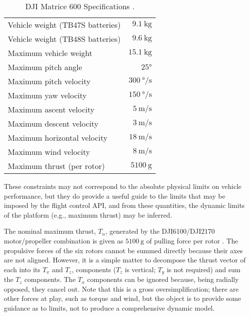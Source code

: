\documentclass[doc]{apa6}
\begin{document}
\begin{table}
\begin{center}
\begin{tabular}{ l r }
\hline
Vehicle weight (TB47S batteries) & $\SI{9.1}\kg$ \\ 
Vehicle weight (TB48S batteries) & $\SI{9.6}\kg$ \\
Maximum vehicle weight & $\SI{15.1}\kg$ \\
Maximum pitch angle & $\ang{25}$ \\
Maximum pitch velocity & $\SI{300}{\degree\per\second}$ \\
Maximum yaw velocity & $\SI{150}{\degree\per\second}$ \\
Maximum ascent velocity & $\SI{5}{\metre\per\second}$ \\
Maximum descent velocity & $\SI{3}{\metre\per\second}$ \\
Maximum horizontal velocity & $\SI{18}{\metre\per\second}$ \\
Maximum wind velocity & $\SI{8}{\metre\per\second}$ \\
Maximum thrust (per rotor) & $\SI{5100}{\g}$ \\
\hline
\end{tabular}
\end{center}
\caption{DJI Matrice 600 Specifications \parencite{DJI2017}.}
\label{table:djispecs}
\end{table}

These constraints may not correspond to the absolute physical limits on vehicle performance, but they do provide a useful guide to the limits that may be imposed by the flight control API, and from these quantities, the dynamic limits of the platform (e.g., maximum thrust) may be inferred.

The nominal maximum thrust, $T_n$, generated by the DJI6100/DJI2170 motor/propeller combination is given as $\SI{5100}\g$ of pulling force per rotor \parencite{DJI2017}. The propulsive forces of the six rotors cannot be summed directly because their axes are not aligned. However, it is a simple matter to decompose the thrust vector of each into its $T_x$ and $T_z$, components ($T_z$ is vertical; $T_y$ is not required) and sum the $T_z$ components. The $T_x$ components can be ignored because, being radially opposed, they cancel out. Note that this is a gross oversimplification; there are other forces at play, such as torque and wind, but the object is to provide some guidance as to limits, not to produce a comprehensive dynamic model.
\end{document}
